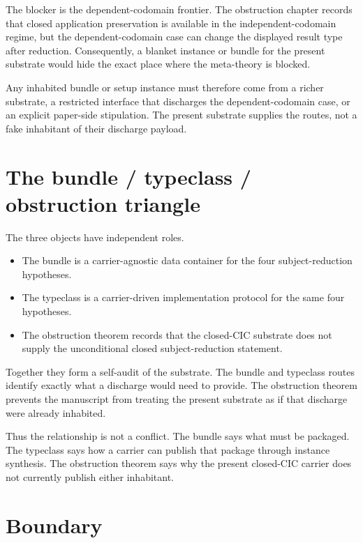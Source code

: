 The blocker is the dependent-codomain frontier.
The obstruction chapter records that closed application preservation is
available in the independent-codomain regime, but the dependent-codomain
case can change the displayed result type after reduction.
Consequently, a blanket instance or bundle for the present substrate
would hide the exact place where the meta-theory is blocked.

Any inhabited bundle or setup instance must therefore come from a richer
substrate, a restricted interface that discharges the dependent-codomain
case, or an explicit paper-side stipulation.
The present substrate supplies the routes, not a fake inhabitant of
their discharge payload.

\section{The bundle / typeclass / obstruction triangle}
\label{sec:sr-discharge-routes-triangle}

The three objects have independent roles.

\begin{itemize}
\item The bundle is a carrier-agnostic data container for the four
subject-reduction hypotheses.
\item The typeclass is a carrier-driven implementation protocol for the
same four hypotheses.
\item The obstruction theorem
records that the closed-CIC substrate does not supply the unconditional
closed subject-reduction statement.
\end{itemize}

Together they form a self-audit of the substrate.
The bundle and typeclass routes identify exactly what a discharge would
need to provide.
The obstruction theorem prevents the manuscript from treating the
present substrate as if that discharge were already inhabited.

Thus the relationship is not a conflict.
The bundle says what must be packaged.
The typeclass says how a carrier can publish that package through
instance synthesis.
The obstruction theorem says why the present closed-CIC carrier does not
currently publish either inhabitant.

\section{Boundary}
\label{sec:sr-discharge-routes-boundary}

